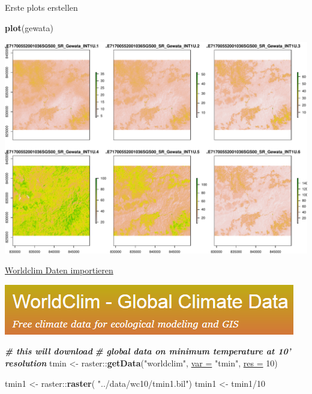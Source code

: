 \documentclass[ignorenonframetext,]{beamer}
\newenvironment{Shaded}{\begin{snugshade}}{\end{snugshade}}
\newcommand{\CommentTok}[1]{\textcolor[rgb]{0.00,0.40,1.00}{\textbf{\textit{#1}}}}
\newcommand{\DataTypeTok}[1]{\textcolor[rgb]{0.74,0.68,0.62}{\underline{#1}}}
\newcommand{\DecValTok}[1]{\textcolor[rgb]{0.27,0.67,0.26}{#1}}
\newcommand{\KeywordTok}[1]{\textcolor[rgb]{0.26,0.66,0.93}{\textbf{#1}}}
\newcommand{\NormalTok}[1]{\textcolor[rgb]{0.74,0.68,0.62}{#1}}
\newcommand{\OperatorTok}[1]{\textcolor[rgb]{0.74,0.68,0.62}{#1}}
\newcommand{\StringTok}[1]{\textcolor[rgb]{0.02,0.61,0.04}{#1}}
\begin{document}
\begin{frame}[fragile]{Erste plots erstellen}
\protect\hypertarget{erste-plots-erstellen}{}

\begin{Shaded}
\begin{Highlighting}[]
\KeywordTok{plot}\NormalTok{(gewata)}
\end{Highlighting}
\end{Shaded}

\includegraphics{A8_Rasterdaten_files/figure-beamer/unnamed-chunk-15-1.pdf}

\end{frame}

\begin{frame}[fragile]{\href{https://pakillo.github.io/R-GIS-tutorial/\#raster}{Worldclim
Daten importieren}}
\protect\hypertarget{worldclim-daten-importieren}{}

\includegraphics{figure/WORLDCLIM.PNG}

\begin{Shaded}
\begin{Highlighting}[]
\CommentTok{# this will download }
\CommentTok{# global data on minimum temperature at 10' resolution}
\NormalTok{tmin <-}\StringTok{ }\NormalTok{raster}\OperatorTok{::}\KeywordTok{getData}\NormalTok{(}\StringTok{"worldclim"}\NormalTok{, }\DataTypeTok{var =} \StringTok{"tmin"}\NormalTok{, }\DataTypeTok{res =} \DecValTok{10}\NormalTok{)}
\end{Highlighting}
\end{Shaded}

\begin{Shaded}
\begin{Highlighting}[]
\NormalTok{tmin1 <-}\StringTok{ }\NormalTok{raster}\OperatorTok{::}\KeywordTok{raster}\NormalTok{( }\StringTok{"../data/wc10/tmin1.bil"}\NormalTok{)}
\NormalTok{tmin1 <-}\StringTok{ }\NormalTok{tmin1}\OperatorTok{/}\DecValTok{10}
\end{Highlighting}
\end{Shaded}

\end{frame}
\end{document}
